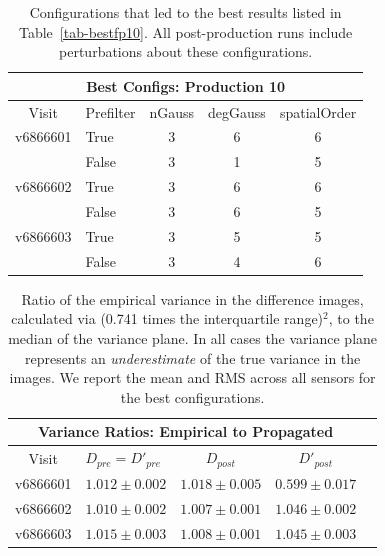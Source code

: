 \documentclass[prd, nofootinbib, floatfix, 11pt,tightenlines,times]{article}
\begin{document}
\begin{table}
\centering
\begin{tabular}{clccc}
\hline
\multicolumn{5}{|c|}{Best Configs: Production 10} \\
\hline
Visit    & Prefilter & nGauss & degGauss & spatialOrder \\
\hline
v6866601 & True      & 3      & 6        & 6 \\
         & False     & 3      & 1        & 5 \\
v6866602 & True      & 3      & 6        & 6 \\
         & False     & 3      & 6        & 5 \\
v6866603 & True      & 3      & 5        & 5 \\
         & False     & 3      & 4        & 6 \\
\end{tabular}
\caption{Configurations that led to the best results listed in
  Table~\ref{tab-bestfp10}.  All post-production runs include
  perturbations about these configurations. \label{tab-bestconfig10}}
\end{table}

\clearpage

\begin{table}
\centering
\begin{tabular}{clccc}
\hline
\multicolumn{4}{|c|}{Variance Ratios: Empirical to Propagated} \\
\hline
Visit    & $D_{pre} = D'_{pre}$ & $D_{post}$ & $D'_{post}$ \\
\hline
v6866601 &$1.012 \pm 0.002$&$1.018 \pm 0.005$&$0.599 \pm 0.017$ \\
v6866602 &$1.010 \pm 0.002$&$1.007 \pm 0.001$&$1.046 \pm 0.002$ \\
v6866603 &$1.015 \pm 0.003$&$1.008 \pm 0.001$&$1.045 \pm 0.003$ \\
\end{tabular}
\caption{Ratio of the empirical variance in the difference images,
  calculated via (0.741 times the interquartile range)$^2$, to the
  median of the variance plane.  In all cases the variance plane
  represents an {\it underestimate} of the true variance in the
  images.  We report the mean and RMS across all sensors for the best
  configurations.  }
\label{tab-variance1}
\end{table}
\end{document}

